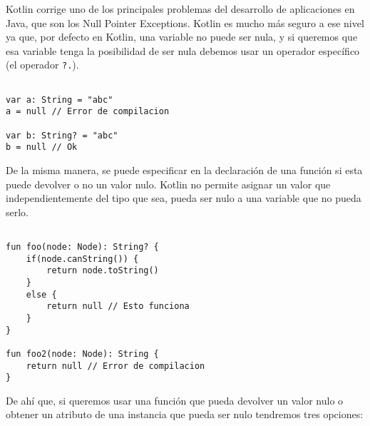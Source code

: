 Kotlin corrige uno de los principales problemas del desarrollo de aplicaciones en Java, que son los Null Pointer Exceptions. Kotlin es mucho más seguro a ese nivel ya que, por defecto en Kotlin, una variable no puede ser nula, y si queremos que esa variable tenga la posibilidad de ser nula debemos usar un operador específico (el operador \texttt{?.}).

\begin{verbatim}

var a: String = "abc"
a = null // Error de compilacion

var b: String? = "abc"
b = null // Ok

\end{verbatim}

De la misma manera, se puede especificar en la declaración de una función si esta puede devolver o no un valor nulo. Kotlin no permite asignar un valor que independientemente del tipo que sea, pueda ser nulo a una variable que no pueda serlo.

\begin{verbatim}

fun foo(node: Node): String? {
	if(node.canString()) {
		return node.toString()
	}
	else {
		return null // Esto funciona
	}
}

fun foo2(node: Node): String {
	return null // Error de compilacion
}

\end{verbatim}

De ahí que, si queremos usar una función que pueda devolver un valor nulo o obtener un atributo de una instancia que pueda ser nulo tendremos tres opciones:


